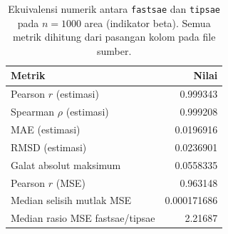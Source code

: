 \begin{table}[htbp]
\centering
\caption{Ekuivalensi numerik antara \texttt{fastsae} dan \texttt{tipsae} pada $n=1000$ area (indikator beta). Semua metrik dihitung dari pasangan kolom pada file sumber.}
\label{tab:equiv}
\small
\begin{tabular}{lr}
\toprule
Metrik & Nilai \\
\midrule
Pearson $r$ (estimasi) & 0.999343 \\
Spearman $\rho$ (estimasi) & 0.999208 \\
MAE (estimasi) & 0.0196916 \\
RMSD (estimasi) & 0.0236901 \\
Galat absolut maksimum & 0.0558335 \\
Pearson $r$ (MSE) & 0.963148 \\
Median selisih mutlak MSE & 0.000171686 \\
Median rasio MSE fastsae/tipsae & 2.21687 \\
\bottomrule
\end{tabular}
\end{table}

